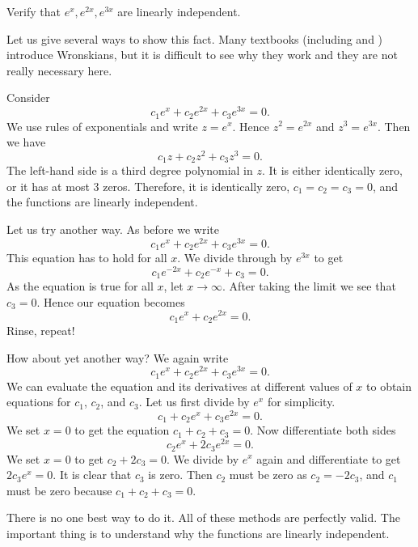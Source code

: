 \begin{example}
Verify that $e^x, e^{2x}, e^{3x}$ are linearly independent.

Let us give several ways to show this fact.
Many textbooks (including \cite{EP} and
\cite{F}) introduce Wronskians, but it is difficult to see why they work and
they are not really necessary here.

Consider
\begin{equation*}
c_1 e^x + c_2 e^{2x} + c_3 e^{3x} = 0.
\end{equation*}
We use rules of exponentials and write $z = e^x$.  Hence $z^2 = e^{2x}$
and $z^3 = e^{3x}$.  Then we have
\begin{equation*}
c_1 z + c_2 z^2 + c_3 z^3 = 0.
\end{equation*}
The left-hand side is a third degree polynomial in $z$.
It is either identically zero,
or it has at most 3 zeros.  Therefore, it is identically zero,
$c_1 = c_2 = c_3 = 0$, and the functions are linearly independent.

Let us try another way.  As before we write
\begin{equation*}
c_1 e^x + c_2 e^{2x} + c_3 e^{3x} = 0.
\end{equation*}
This equation has to hold for all $x$.  We divide through
by $e^{3x}$ to get
\begin{equation*}
c_1 e^{-2x} + c_2 e^{-x} + c_3 = 0.
\end{equation*}
As the equation is true for all $x$, let $x \to \infty$.  After taking the
limit we see that $c_3 = 0$.  Hence our equation becomes
\begin{equation*}
c_1 e^x + c_2 e^{2x} = 0.
\end{equation*}
Rinse, repeat!

How about yet another way?  We again write
\begin{equation*}
c_1 e^x + c_2 e^{2x} + c_3 e^{3x} = 0.
\end{equation*}
We can evaluate the equation and its derivatives at different
values of $x$ to obtain equations for
$c_1$, $c_2$, and $c_3$.
Let us first
divide by $e^{x}$ for simplicity.
\begin{equation*}
c_1 + c_2 e^{x} + c_3 e^{2x} = 0.
\end{equation*}
We set $x=0$ to get the equation $c_1 + c_2 + c_3 = 0$.  Now differentiate
both sides
\begin{equation*}
c_2 e^{x} + 2 c_3 e^{2x} = 0 .
\end{equation*}
We set $x=0$ to get $c_2 + 2c_3 = 0$.  We divide by $e^x$ again and
differentiate to get
$2 c_3 e^{x} = 0$.  It is clear that $c_3$ is zero.  Then $c_2$ must be
zero as $c_2 = -2c_3$, and $c_1$ must be zero because $c_1 + c_2 + c_3 = 0$.

There is no one best way to do it.  All of these methods are perfectly valid.
The important thing is to understand why the functions are linearly
independent.
\end{example}

